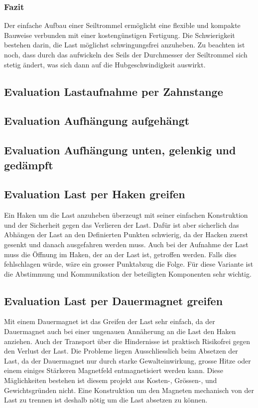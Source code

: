 \documentclass[a4paper]{report}
\begin{document}
	\subsubsection{Fazit}

	Der einfache Aufbau einer Seiltrommel ermöglicht eine flexible und kompakte Bauweise verbunden mit einer kostengünstigen Fertigung. Die Schwierigkeit bestehen darin, die Last möglichst schwingungsfrei anzuheben. Zu beachten ist noch, dass durch das aufwickeln des Seils der Durchmesser der Seiltrommel sich stetig ändert, was sich dann auf die Hubgeschwindigkeit auswirkt.


\subsection{Evaluation Lastaufnahme per Zahnstange}


\subsection{Evaluation Aufhängung aufgehängt}


\subsection{Evaluation Aufhängung unten, gelenkig und gedämpft}


\subsection{Evaluation Last per Haken greifen}
Ein Haken um die Last anzuheben überzeugt mit seiner einfachen Konstruktion und der Sicherheit gegen das Verlieren der Last. Dafür ist aber sicherlich das Abhängen der Last an den Definierten Punkten schwierig, da der Hacken zuerst gesenkt und danach ausgefahren werden muss. Auch bei der Aufnahme der Last muss die Öffnung im Haken, der an der Last ist, getroffen werden. Falls dies fehlschlagen würde, wäre ein grosser Punktabzug die Folge. Für diese Variante ist die Abstimmung und Kommunikation der beteiligten Komponenten sehr wichtig.



\subsection{Evaluation Last per Dauermagnet greifen}
Mit einem Dauermagnet ist das Greifen der Last sehr einfach, da der Dauermagnet auch bei einer ungenauen Annäherung an die Last den Haken anziehen. Auch der Transport über die Hindernisse ist praktisch Risikofrei gegen den Verlust der Last. Die Probleme liegen Ausschliesslich beim Absetzen der Last, da der Dauermagnet nur durch starke Gewalteinwirkung, grosse Hitze oder einem einiges Stärkeren Magnetfeld entmagnetisiert werden kann. Diese Mäglichkeiten bestehen ist diesem projekt aus Kosten-, Grössen-, und Gewichtsgründen nicht. Eine Konstruktion um den Magneten mechanisch von der Last zu trennen ist deshalb nötig um die Last absetzen zu können.
\end{document}
